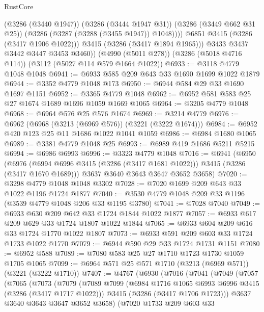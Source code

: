\begin{lexlean}{RustCore}
\begin{coremodule}
                (@3286 (@3440 @1947))
                (@3286 (@3444 @1947 @31))
                (@3286 (@3449 @662 @31 @25))
                (@3286 (@3287 (@3288 (@3455 @1947)) @1048))))
            @6851
            @3415
            (@3286 (@3417 @1906 @1022)))
          @3415
          (@3286 (@3417 @1894 @1965)))
        @3433
        @3437
        @3442
        @3447
        @3453
        @3460))
    (@4990 (@5011 @278))
    (@3286 (@5018 @4716 @114))
    (@3112 (@5027 @114 @579 @1664 @1022))
@6933 := @3118 @4779 @1048 @1048
@6941 := @6933 @585 @209 @643 @33 @1690 @1699 @1022 @1879
@6944 := @3352 @4779 @1048 @173
@6950 := @6944 @584 @29 @33 @1690 @1697 @1151
@6952 := @3365 @4779 @1048
@6962 := @6952 @581 @583 @25 @27 @1674 @1689 @1696 @1059 @1669 @1065
@6964 := @3205 @4779 @1048
@6968 := @6964 @576 @25 @576 @1674
@6969 := @3214 @4779
@6976 := @6962 (@6968 (@3213 (@6969 @576)) (@3221 (@3222 @1674)))
@6984 := @6952 @420 @123 @25 @11 @1686 @1022 @1041 @1059
@6986 := @6984 @1680 @1065
@6989 := @3381 @4779 @1048 @25
@6993 := @6989 @419 @1686 @5211 @5215
@6994 := @6986 @6993
@6996 := @3323 @4779 @1048
@7016 := @6941
    (@6950
      (@6976 (@6994 @6996 @3415 (@3286 (@3417 @1681 @1022))) @3415 (@3286 (@3417 @1670 @1689)))
      @3637
      @3640
      @3643
      @3647
      @3652
      @3658)
@7020 := @3298 @4779 @1048 @1048 @3302
@7028 := @7020 @1699 @209 @643 @33 @1022 @1196 @1724 @1877
@7040 := @3530 @4779 @1048 @209 @33 @1196 (@3539 @4779 @1048 @206 @33 @1195 @3780)
@7041 := @7028 @7040
@7049 := @6933 @630 @209 @642 @33 @1724 @1844 @1022 @1877
@7057 := @6933 @617 @209 @629 @33 @1724 @1807 @1022 @1844
@7065 := @6933 @604 @209 @616 @33 @1724 @1770 @1022 @1807
@7073 := @6933 @591 @209 @603 @33 @1724 @1733 @1022 @1770
@7079 := @6944 @590 @29 @33 @1724 @1731 @1151
@7080 := @6952 @588
@7089 := @7080 @583 @25 @27 @1710 @1723 @1730 @1059 @1705 @1065
@7099 := @6964 @571 @25 @571 @1710 (@3213 (@6969 @571)) (@3221 (@3222 @1710))
@7407 := @4767
    (@6930
      (@7016
        (@7041
          (@7049
            (@7057
              (@7065
                (@7073
                  (@7079
                    (@7089
                      @7099
                      (@6984 @1716 @1065 @6993 @6996 @3415 (@3286 (@3417 @1717 @1022)))
                      @3415
                      (@3286 (@3417 @1706 @1723)))
                    @3637
                    @3640
                    @3643
                    @3647
                    @3652
                    @3658)
                  (@7020
                    @1733
                    @209
                    @603
                    @33

\end{coremodule}
\end{lexlean}
